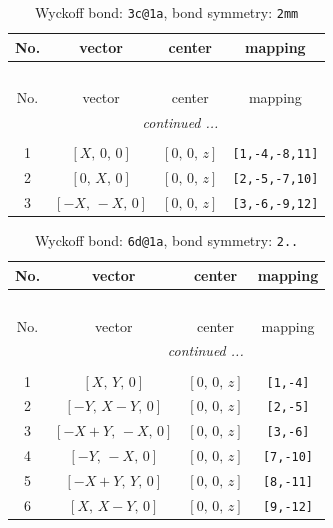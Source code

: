\documentclass[fleqn,8pt]{jsarticle}
\begin{document}
\renewcommand{\arraystretch}{1.2}
\begin{longtable}{cccc}
\caption{Wyckoff bond: {\tt 3c@1a}, bond symmetry: {\tt 2mm}}
 \\
 \hline \hline
No. & vector & center & mapping \\ \hline \endfirsthead

\multicolumn{3}{l}{\tablename\ \thetable{}} \\
 \hline \hline
No. & vector & center & mapping \\ \hline \endhead

 \hline \hline
\multicolumn{3}{r}{\footnotesize\it continued ...} \\ \endfoot

 \hline \hline
\multicolumn{3}{r}{} \\ \endlastfoot

1 & $\left[ X,\, 0,\, 0 \right]$ & $\left[ 0,\, 0,\, z \right]$ & {\tt [1,-4,-8,11]} \\ \hline
2 & $\left[ 0,\, X,\, 0 \right]$ & $\left[ 0,\, 0,\, z \right]$ & {\tt [2,-5,-7,10]} \\ \hline
3 & $\left[ - X,\, - X,\, 0 \right]$ & $\left[ 0,\, 0,\, z \right]$ & {\tt [3,-6,-9,12]} \\
\end{longtable}
\renewcommand{\arraystretch}{1.2}
\begin{longtable}{cccc}
\caption{Wyckoff bond: {\tt 6d@1a}, bond symmetry: {\tt 2..}}
 \\
 \hline \hline
No. & vector & center & mapping \\ \hline \endfirsthead

\multicolumn{3}{l}{\tablename\ \thetable{}} \\
 \hline \hline
No. & vector & center & mapping \\ \hline \endhead

 \hline \hline
\multicolumn{3}{r}{\footnotesize\it continued ...} \\ \endfoot

 \hline \hline
\multicolumn{3}{r}{} \\ \endlastfoot

1 & $\left[ X,\, Y,\, 0 \right]$ & $\left[ 0,\, 0,\, z \right]$ & {\tt [1,-4]} \\ \hline
2 & $\left[ - Y,\, X - Y,\, 0 \right]$ & $\left[ 0,\, 0,\, z \right]$ & {\tt [2,-5]} \\ \hline
3 & $\left[ - X + Y,\, - X,\, 0 \right]$ & $\left[ 0,\, 0,\, z \right]$ & {\tt [3,-6]} \\ \hline
4 & $\left[ - Y,\, - X,\, 0 \right]$ & $\left[ 0,\, 0,\, z \right]$ & {\tt [7,-10]} \\ \hline
5 & $\left[ - X + Y,\, Y,\, 0 \right]$ & $\left[ 0,\, 0,\, z \right]$ & {\tt [8,-11]} \\ \hline
6 & $\left[ X,\, X - Y,\, 0 \right]$ & $\left[ 0,\, 0,\, z \right]$ & {\tt [9,-12]} \\
\end{longtable}
\end{document}
